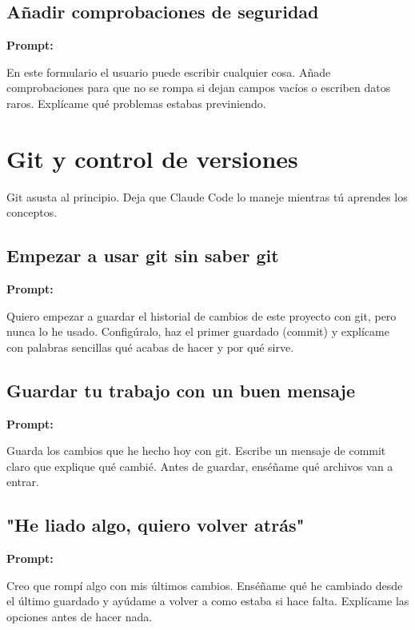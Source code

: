 \documentclass[11pt,a4paper]{report}
\begin{document}
\subsection{Añadir comprobaciones de seguridad}

\noindent\textbf{Prompt: }
\begin{codebox}
En este formulario el usuario puede escribir cualquier cosa. Añade comprobaciones para que no se rompa si dejan campos vacíos o escriben datos raros. Explícame qué problemas estabas previniendo.
\end{codebox}

\section{ Git y control de versiones}

Git asusta al principio. Deja que Claude Code lo maneje mientras tú aprendes los conceptos.

\subsection{Empezar a usar git sin saber git}

\noindent\textbf{Prompt: }
\begin{codebox}
Quiero empezar a guardar el historial de cambios de este proyecto con git, pero nunca lo he usado. Configúralo, haz el primer guardado (commit) y explícame con palabras sencillas qué acabas de hacer y por qué sirve.
\end{codebox}

\subsection{Guardar tu trabajo con un buen mensaje}

\noindent\textbf{Prompt: }
\begin{codebox}
Guarda los cambios que he hecho hoy con git. Escribe un mensaje de commit claro que explique qué cambié. Antes de guardar, enséñame qué archivos van a entrar.
\end{codebox}

\subsection{"He liado algo, quiero volver atrás"}

\noindent\textbf{Prompt: }
\begin{codebox}
Creo que rompí algo con mis últimos cambios. Enséñame qué he cambiado desde el último guardado y ayúdame a volver a como estaba si hace falta. Explícame las opciones antes de hacer nada.
\end{codebox}
\end{document}
